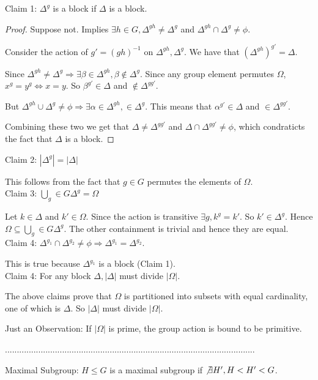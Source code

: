 Claim 1: $\Delta^g$ is a block if $\Delta$ is a block. 

\begin{proof}
Suppose not. Implies $\exists h \in G, \Delta^{gh} \ne \Delta^g$ and $\Delta^{gh} \cap \Delta^g \ne \phi$.

Consider the action of $g' = (gh)^{-1}$ on $\Delta^{gh}, \Delta^g$. We have that $(\Delta^{gh})^{g'} = \Delta$.

Since $\Delta^{gh} \ne \Delta^g \Rightarrow \exists \beta \in \Delta^{gh}, \beta \notin \Delta^g$. Since any group element permutes $\Omega$, $x^g = y^g \Leftrightarrow x = y$. So $\beta^{g'} \in \Delta$ and $\notin \Delta^{gg'}$.

But $\Delta^{gh} \cup \Delta^g \ne \phi \Rightarrow \exists \alpha \in \Delta^{gh}, \in \Delta^g$. This means that $\alpha^{g'} \in \Delta$ and $\in \Delta^{gg'}$. 

Combining these two we get that $\Delta \ne \Delta^{gg'}$ and $\Delta \cap \Delta^{gg'} \ne \phi$, which condraticts the fact that $\Delta$ is a block.

\end{proof}


Claim 2: $|\Delta^g| = |\Delta|$

This follows from the fact that $g \in G$ permutes the elements of $\Omega$.
\\
Claim 3: $\bigcup_g \in G \Delta^g = \Omega$

Let $k \in \Delta$ and $k' \in \Omega$. Since the action is transitive $\exists g, k^g = k'$. So $k' \in \Delta^g$. Hence $\Omega \subseteq \bigcup_g \in G \Delta^g $. The other containment is trivial and hence they are equal.
\\
Claim 4: $\Delta^{g_1} \cap \Delta^{g_2} \ne \phi \Rightarrow \Delta^{g_1} = \Delta^{g_2}$. 

This is true because $\Delta^{g_1}$ is a block (Claim 1).
\\
Claim 4: For any block $\Delta , |\Delta|$ must divide $|\Omega|$.

The above claims prove that $\Omega$ is partitioned into subsets with equal cardinality, one of which is $\Delta$. So $|\Delta|$ must divide $|\Omega|$. 

Just an Observation: If $|\Omega |$ is prime, the group action is bound to be primitive. 

.........................................................................................................

\begin{definition}{Maximal Subgroup:}
$H \leq G$ is a maximal subgroup if $\not \exists H',H < H' < G$.
\end{definition}


